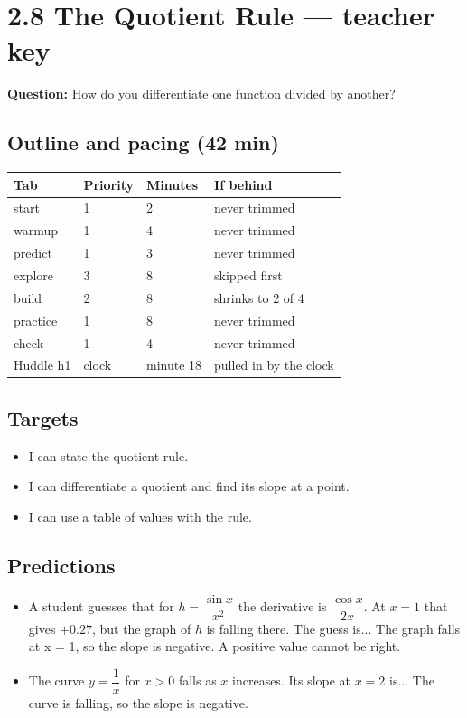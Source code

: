 \documentclass[11pt]{article}
\begin{document}
\section*{2.8 The Quotient Rule --- teacher key}
\textbf{Question:} How do you differentiate one function divided by another?\par
\subsection*{Outline and pacing (42 min)}\begin{tabular}{@{}llll@{}}\toprule Tab & Priority & Minutes & If behind\\\midrule
start & 1 & 2 & never trimmed\\
warmup & 1 & 4 & never trimmed\\
predict & 1 & 3 & never trimmed\\
explore & 3 & 8 & skipped first\\
build & 2 & 8 & shrinks to 2 of 4\\
practice & 1 & 8 & never trimmed\\
check & 1 & 4 & never trimmed\\
Huddle h1 & clock & minute 18 & pulled in by the clock\\
\bottomrule\end{tabular}
\subsection*{Targets}\begin{itemize}\item I can state the quotient rule.
\item I can differentiate a quotient and find its slope at a point.
\item I can use a table of values with the rule.\end{itemize}
\subsection*{Predictions}\begin{itemize}
\item A student guesses that for $h=\dfrac{\sin x}{x^{2}}$ the derivative is $\dfrac{\cos x}{2x}$. At $x=1$ that gives $+0.27$, but the graph of $h$ is falling there. The guess is...  The graph falls at x = 1, so the slope is negative. A positive value cannot be right.
\item The curve $y=\dfrac{1}{x}$ for $x>0$ falls as $x$ increases. Its slope at $x=2$ is...  The curve is falling, so the slope is negative.
\end{itemize}
\end{document}
